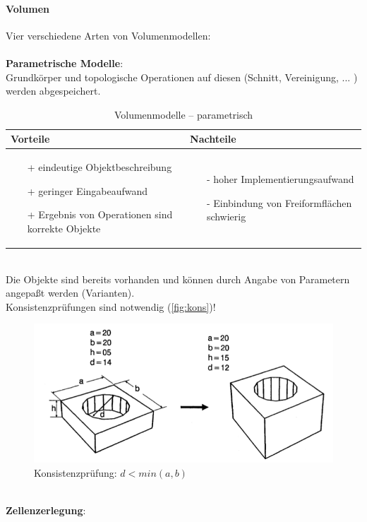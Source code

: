 \paragraph*{Volumen} Vier verschiedene Arten von Volumenmodellen:\\ \\
\textbf{Parametrische Modelle}:\\
Grundkörper und topologische Operationen auf diesen (Schnitt, Vereinigung, ... ) werden abgespeichert. 
\begin{table}[hbt]
\centering
\begin{tabular}{|p{6.5cm}|p{6.5cm}|}
\hline
Vorteile & Nachteile\\
\hline
\vspace{-5mm}
\begin{itemize}
\setlength\itemsep{0em}
\item[+] eindeutige Objektbeschreibung 
\item[+] geringer Eingabeaufwand 
\item[+] Ergebnis von Operationen sind korrekte Objekte
\end{itemize}
 &
 \vspace{-5mm}
\begin{itemize}
\setlength\itemsep{0em}
\item[-] hoher Implementierungsaufwand
\item[-] Einbindung von Freiformflächen schwierig
\end{itemize}\\
\hline
\end{tabular}
\caption{Volumenmodelle -- parametrisch}
\label{tab:Volmod}
\end{table}\\ 
Die Objekte sind bereits vorhanden und können durch Angabe von Parametern angepaßt werden (Varianten).\\
Konsistenzprüfungen sind notwendig (\autoref{fig:kons})! \\
\begin{figure}[h!]
	\centering 
	\includegraphics[width=0.3\linewidth]{figures/ch02_kons.png}
	\caption{Konsistenzprüfung: $d < min(a,b)$}
\label{fig:kons}
\end{figure}\\
\noindent
\textbf{Zellenzerlegung}:\\
